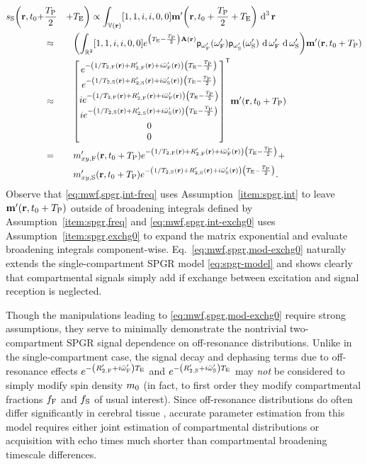 \begin{alignat}{2}
	\spgr\bigg(\bmr,t_0+
		&\frac{\TP}{2}&
		+ &\TE\bigg) \propto
			\int_{\setV\pr} \brac{1, 1, i, i, 0, 0} \bmmp\paren{\bmr,t_0+\frac{\TP}{2}+\TE} \dercubed{\bmr} 
			\label{eq:mwf,spgr,int} \\
		&\approx& 
			&\paren{\int_{\real^2} \brac{1, 1, i, i, 0, 0}
				e^{\paren{\TE-\frac{\TP}{2}}\bmA\pr} 
				\dista{\ompf} \dista{\omps} \der{\ompf} \der{\omps}} 
				\bmmp\paren{\bmr,t_0+\TP} 
				\label{eq:mwf,spgr,int-freq} \\
		&\approx&
			&\begin{bmatrix}
				e^{-\paren{1/\tf{2}\pr+\Rtpf\pr+i\ompfmed\pr}\paren{\TE-\frac{\TP}{2}}} \\
				e^{-\paren{1/\ts{2}\pr+\Rtps\pr+i\ompsmed\pr}\paren{\TE-\frac{\TP}{2}}} \\
				ie^{-\paren{1/\tf{2}\pr+\Rtpf\pr+i\ompfmed\pr}\paren{\TE-\frac{\TP}{2}}} \\
				ie^{-\paren{1/\ts{2}\pr+\Rtps\pr+i\ompsmed\pr}\paren{\TE-\frac{\TP}{2}}} \\
				0 \\
				0
			\end{bmatrix}
			\tpose \bmmp\paren{\bmr,t_0+\TP}
			\label{eq:mwf,spgr,int-exchg0} \\
		&=\,& 
			&\mxypf\paren{\bmr,t_0+\TP} 
				e^{-\paren{1/\tf{2}\pr+\Rtpf\pr+i\ompfmed\pr}\paren{\TE-\frac{\TP}{2}}} +
				\nonumber \\
		&& 
			&\mxyps\paren{\bmr,t_0+\TP} 
				e^{-\paren{1/\ts{2}\pr+\Rtps\pr+i\ompsmed\pr}\paren{\TE-\frac{\TP}{2}}}.
			\label{eq:mwf,spgr,mod-exchg0}
\end{alignat}
Observe that \eqref{eq:mwf,spgr,int-freq}
uses Assumption~\ref{item:spgr,int}
to leave $\bmmp\paren{\bmr,t_0+\TP}$
outside of broadening integrals
defined by Assumption~\ref{item:spgr,freq}
and 
\eqref{eq:mwf,spgr,int-exchg0}
uses Assumption~\ref{item:spgr,exchg0}
to expand the matrix exponential
and evaluate broadening integrals component-wise.
Eq.~\eqref{eq:mwf,spgr,mod-exchg0} naturally extends
the single-compartment SPGR model \eqref{eq:spgr-model} 
and shows clearly
that compartmental signals simply add
if exchange between excitation and signal reception is neglected. 

Though the manipulations leading
to \eqref{eq:mwf,spgr,mod-exchg0} require strong assumptions,
they serve to minimally demonstrate 
the nontrivial two-compartment SPGR signal dependence
on off-resonance distributions.
Unlike in the single-compartment case,
the signal decay and dephasing terms
due to off-resonance effects
$e^{-\paren{\Rtpf+i\ompfmed}\TE}$ and $e^{-\paren{\Rtps+i\ompsmed}\TE}$
may \emph{not} be considered
to simply modify spin density $m_0$
(in fact,
to first order
they modify compartmental fractions $f_{\mathrm{F}}$ and $f_{\mathrm{S}}$
of usual interest).
Since off-resonance distributions
do often differ significantly in cerebral tissue
\cite{miller:10:aot-1, miller:10:aot-2}, 
accurate \invivo parameter estimation
from this model 
requires either joint estimation
of compartmental distributions
or acquisition with echo times much shorter
than compartmental broadening timescale differences. 


